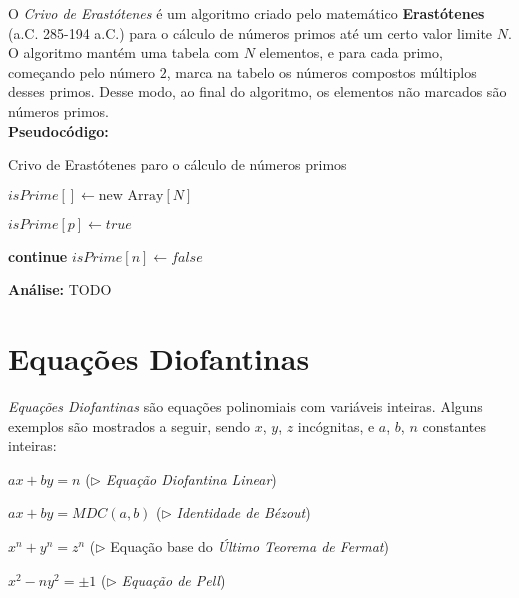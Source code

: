 O \textit{Crivo de Erastótenes} é um algoritmo criado pelo matemático \textbf{Erastótenes} (a.C. 285-194 a.C.) para o cálculo de números primos
até um certo valor limite $N$.
O algoritmo mantém uma tabela com $N$ elementos, e para cada primo, começando pelo número $2$, marca na tabelo os números compostos múltiplos desses primos.
Desse modo, ao final do algoritmo, os elementos não marcados são números primos.\\

\textbf{Pseudocódigo:}
\begin{algorithm}
\caption{Crivo de Erastótenes paro o cálculo de números primos}\label{crivo_erastotenes}
\begin{algorithmic}[1]
\State $isPrime[] \gets \text{new Array}[N]$ 

\State $isPrime[p] \gets true$
\EndFor

\State \textbf{continue}
\EndIf
{}
\State $isPrime[n] \gets false$
\EndFor
\EndFor

\State {}
\EndProcedure
\end{algorithmic}
\end{algorithm}

\textbf{Análise:}
TODO



\section{Equações Diofantinas}

\textit{Equações Diofantinas} são equações polinomiais com variáveis inteiras. Alguns exemplos são mostrados a seguir, sendo $x$, $y$, $z$ incógnitas, e $a$, $b$, $n$ constantes inteiras:

$ax + by = n$ ($\triangleright$ \textit{Equação Diofantina Linear})

$ax + by = MDC(a,b)$ ($\triangleright$ \textit{Identidade de Bézout})

$x^n + y^n = z^n$ ($\triangleright$ Equação base do \textit{Último Teorema de Fermat})

$x^2 - ny^2 = \pm 1$ ($\triangleright$ \textit{Equação de Pell})\\



